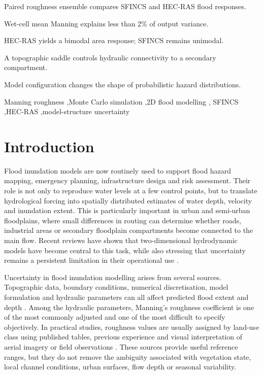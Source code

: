 \documentclass[a4paper,fleqn]{cas-sc}
\begin{document}
\begin{highlights}
\item Paired roughness ensemble compares SFINCS and HEC-RAS flood responses.
\item Wet-cell mean Manning explains less than 2\% of output variance.
\item HEC-RAS yields a bimodal area response; SFINCS remains unimodal.
\item A topographic saddle controls hydraulic connectivity to a secondary compartment.
\item Model configuration changes the shape of probabilistic hazard distributions.
\end{highlights}

\begin{keywords}
Manning roughness \sep Monte Carlo simulation \sep 2D flood modelling \sep
SFINCS \sep HEC-RAS \sep model-structure uncertainty
\end{keywords}

\maketitle

\section{Introduction}
\label{sec:intro}
Flood inundation models are now routinely used to support flood hazard mapping, emergency planning, infrastructure design and risk assessment. Their role is not only to reproduce water levels at a few control points, but to translate hydrological forcing into spatially distributed estimates of water depth, velocity and inundation extent. This is particularly important in urban and semi-urban floodplains, where small differences in routing can determine whether roads, industrial areas or secondary floodplain compartments become connected to the main flow. Recent reviews have shown that two-dimensional hydrodynamic models have become central to this task, while also stressing that uncertainty remains a persistent limitation in their operational use \citep{teng2017}.

Uncertainty in flood inundation modelling arises from several sources. Topographic data, boundary conditions, numerical discretisation, model formulation and hydraulic parameters can all affect predicted flood extent and depth \citep{pappenberger2005,apel2008,merwade2008,teng2017}. Among the hydraulic parameters, Manning's roughness coefficient is one of the most commonly adjusted and one of the most difficult to specify objectively. In practical studies, roughness values are usually assigned by land-use class using published tables, previous experience and visual interpretation of aerial imagery or field observations \citep{chow1959,barnes1967,arcement1989,brater1996}. These sources provide useful reference ranges, but they do not remove the ambiguity associated with vegetation state, local channel conditions, urban surfaces, flow depth or seasonal variability.
\end{document}
